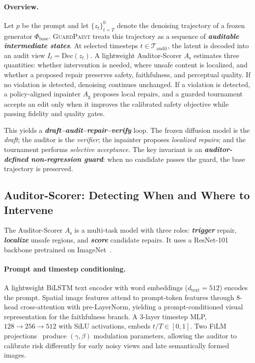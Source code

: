 \documentclass[11pt]{article}
\newcommand{\As}{A_{\mathrm{s}}}
\newcommand{\Ag}{A_{\mathrm{g}}}
\begin{document}
\paragraph{Overview.}
Let $p$ be the prompt and let
$\{z_t\}_{t=T}^{0}$ denote the denoising trajectory of a frozen generator
$\Phi_{\mathrm{base}}$. \textsc{GuardPaint} treats this trajectory as a
sequence of \textbf{\emph{auditable intermediate states}}. At selected
timesteps $t\in\mathcal{T}_{\mathrm{audit}}$, the latent is decoded into an
audit view $I_t=\mathrm{Dec}(z_t)$. A lightweight Auditor-Scorer $\As$
estimates three quantities: whether intervention is needed, where unsafe
content is localized, and whether a proposed repair preserves safety,
faithfulness, and perceptual quality. If no violation is detected, denoising
continues unchanged. If a violation is detected, a policy-aligned inpainter
$\Ag$ proposes local repairs, and a guarded tournament accepts an edit only
when it improves the calibrated safety objective while passing fidelity and
quality gates.

This yields a \textbf{\emph{draft--audit--repair--verify}} loop. The frozen
diffusion model is the \emph{draft}; the auditor is the \emph{verifier}; the
inpainter proposes \emph{localized repairs}; and the tournament performs
\emph{selective acceptance}. The key invariant is an
\textbf{\emph{auditor-defined non-regression guard}}: when no candidate passes
the guard, the base trajectory is preserved.

\subsection{Auditor-Scorer: Detecting When and Where to Intervene}
\label{sec:auditor}

The Auditor-Scorer $\As$ is a multi-task model with three roles:
\textbf{\emph{trigger}} repair, \textbf{\emph{localize}} unsafe regions, and
\textbf{\emph{score}} candidate repairs. It uses a ResNet-101 backbone
pretrained on ImageNet~\cite{he2016deep}.

\paragraph{Prompt and timestep conditioning.}
A lightweight BiLSTM text encoder with word embeddings
($d_{\mathrm{text}}=512$) encodes the prompt. Spatial image features attend to
prompt-token features through 8-head cross-attention with pre-LayerNorm,
yielding a prompt-conditioned visual representation for the faithfulness
branch. A 3-layer timestep MLP,
$128\!\to\!256\!\to\!512$ with SiLU activations, embeds
$t/T\in[0,1]$. Two FiLM projections~\cite{perez2018film} produce
$(\gamma,\beta)$ modulation parameters, allowing the auditor to calibrate
risk differently for early noisy views and late semantically formed images.
\end{document}
